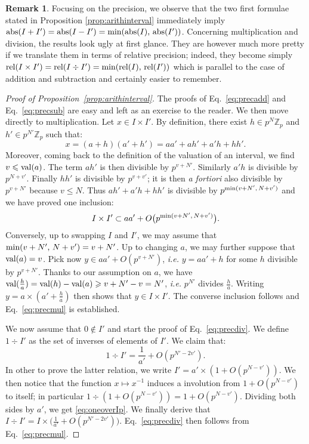 \documentclass[11pt]{article}
\numberwithin{equation}{section}
\numberwithin{figure}{section}
\renewcommand{\leq}{\leqslant}
\renewcommand{\geq}{\geqslant}
\theoremstyle{definition}
\newtheorem{rem}[theo]{Remark}
\newcommand{\Z}{\mathbb Z}
\newcommand{\Zp}{\Z_p}
\renewcommand{\min}{\text{\rm min}}
\newcommand{\val}{\text{\rm val}}
\newcommand{\abs}{\text{\rm abs}}
\newcommand{\rel}{\text{\rm rel}}
\begin{document}
\begin{rem}
\label{rem:arithinterval}
Focusing on the precision, we observe that the two first 
formulae stated in Proposition \ref{prop:arithinterval} immediately
imply $\abs(I + I') = \abs(I - I') = \min(\abs(I), \, \abs(I'))$.
Concerning multiplication and division, the results look ugly at 
first glance. They are however much more pretty if we translate them 
in terms of relative precision; indeed, they become simply
$\rel(I\times I') = \rel(I \div I') = \min(\rel(I), \, \rel(I'))$
which is parallel to the case of addition and subtraction and
certainly easier to remember.
\end{rem}

\begin{proof}[Proof of Proposition~\ref{prop:arithinterval}]
The proofs of Eq.~\eqref{eq:precadd} and Eq.~\eqref{eq:precsub} are easy
and left as an exercise to the reader. We then move directly to
multiplication. Let $x \in I \times I'$. By definition, there exist
$h \in p^N \Zp$ and $h' \in p^{N'}\Zp$ such that:
$$x = (a + h) (a' + h')
= aa' + ah' + a'h + hh'.$$
Moreover, coming back to the definition of the valuation of an
interval, we find $v \leq \val(a)$. The term $ah'$ is then divisible 
by $p^{v+N'}$. Similarly $a'h$ is divisible by $p^{N+v'}$. Finally
$hh'$ is divisible by $p^{v+v'}$; it is then \emph{a fortiori} also
divisible by $p^{v+N'}$ because $v \leq N$. Thus $ah'+ a'h + hh'$
is divisible by $p^{\min(v+N',\,N+v')}$ and we have proved one
inclusion:
$$I \times I' \subset aa' + O\big(p^{\min(v+N',\,N+v')}\big).$$
Conversely, up to swapping $I$ and $I'$, we may assume that $\min
(v+N',\,N+v') = v+N'$. Up to changing $a$, we may further suppose
that $\val(a) = v$. Pick now $y \in aa' + O(p^{v+N'})$, \emph{i.e.}
$y = aa' + h$ for some $h$ divisible by $p^{v+N'}$. 
Thanks to our assumption on $a$, we have $\val(\frac h a) = \val(h) - 
\val(a) \geq v + N' - v = N'$, \emph{i.e.} $p^{N'}$ divides
$\frac h a$. Writing $y = a \times (a' + \frac h a)$ then shows 
that $y \in I \times I'$. The converse inclusion follows and
Eq.~\eqref{eq:precmul} is established.

We now assume that $0 \not\in I'$ and start the proof of 
Eq.~\eqref{eq:precdiv}. We define $1 \div I'$ as the set of 
inverses of elements of $I'$. We claim that:
\begin{equation}
\label{eq:oneoverIp}
1 \div I' = \frac 1{a'} + O(p^{N'-2v'}).
\end{equation}
In other to prove the latter relation, we write $I' = a' \times 
(1 + O(p^{N-v'}))$. We then notice that the function $x \mapsto
x^{-1}$ induces a involution from $1 + O(p^{N-v'})$ to itself; in
particular $1 \div (1 + O(p^{N-v'})) = 1 + O(p^{N-v'})$. Dividing
both sides by $a'$, we get \eqref{eq:oneoverIp}. We finally
derive that
$I \div I' = I \times \big(\frac 1{a'} + O(p^{N'-2v'})\big)$.
Eq.~\eqref{eq:precdiv} then follows from Eq.~\eqref{eq:precmul}.
\end{proof}
\end{document}
